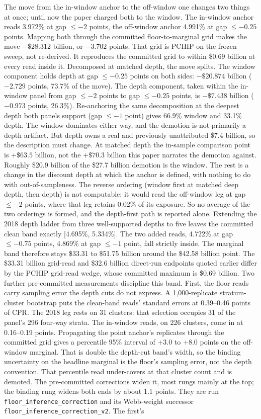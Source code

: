 \documentclass[12pt]{article}
\begin{document}
The move from the in-window anchor to the off-window one changes two things at once; until now the paper charged both to the window. The in-window anchor reads 3.972\% at gap $\leq -2$ points, the off-window anchor 4.991\% at gap $\leq -0.25$ points. Mapping both through the committed floor-to-marginal grid makes the move $-\$28.312$ billion, or $-3.702$ points. That grid is PCHIP on the frozen sweep, not re-derived. It reproduces the committed grid to within \$0.69 billion at every read inside it. Decomposed at matched depth, the move splits. The window component holds depth at gap $\leq -0.25$ points on both sides: $-\$20.874$ billion ($-2.729$ points, 73.7\% of the move). The depth component, taken within the in-window panel from gap $\leq -2$ points to gap $\leq -0.25$ points, is $-\$7.438$ billion ($-0.973$ points, 26.3\%). Re-anchoring the same decomposition at the deepest depth both panels support (gap $\leq -1$ point) gives 66.9\% window and 33.1\% depth. The window dominates either way, and the demotion is not primarily a depth artifact. But depth owns a real and previously unattributed \$7.4 billion, so the description must change. At matched depth the in-sample comparison point is $+\$63.5$ billion, not the $+\$70.3$ billion this paper narrates the demotion against. Roughly \$20.9 billion of the \$27.7 billion demotion is the window. The rest is a change in the discount depth at which the anchor is defined, with nothing to do with out-of-sampleness. The reverse ordering (window first at matched deep depth, then depth) is not computable: it would read the off-window leg at gap $\leq -2$ points, where that leg retains 0.02\% of its exposure. So no average of the two orderings is formed, and the depth-first path is reported alone. Extending the 2018 depth ladder from three well-supported depths to five leaves the committed clean band exactly [4.695\%, 5.334\%]. The two added reads, 4.722\% at gap $\leq -0.75$ points, 4.869\% at gap $\leq -1$ point, fall strictly inside. The marginal band therefore stays \$33.31 to \$51.75 billion around the \$42.58 billion point. The \$33.31 billion grid-read and \$32.6 billion direct-run endpoints quoted earlier differ by the PCHIP grid-read wedge, whose committed maximum is \$0.69 billion. Two further pre-committed measurements discipline this band. First, the floor reads carry sampling error the depth cuts do not express. A 1{,}000-replicate stratum-cluster bootstrap puts the clean-band reads' standard errors at 0.39--0.46 points of CPR. The 2018 leg rests on 31 clusters: that selection occupies 31 of the panel's 296 four-way strata. The in-window reads, on 226 clusters, come in at 0.16--0.19 points. Propagating the point anchor's replicates through the committed grid gives a percentile 95\% interval of $+3.0$ to $+8.0$ points on the off-window marginal. That is double the depth-cut band's width, so the binding uncertainty on the headline marginal is the floor's sampling error, not the depth convention. That percentile read under-covers at that cluster count and is demoted. The pre-committed corrections widen it, most rungs mainly at the top; the binding rung widens both ends by about 1.1 points. They are run \texttt{floor\_inference\_correction} and its Webb-weight successor \texttt{floor\_inference\_correction\_v2}. The first's 
\end{document}
